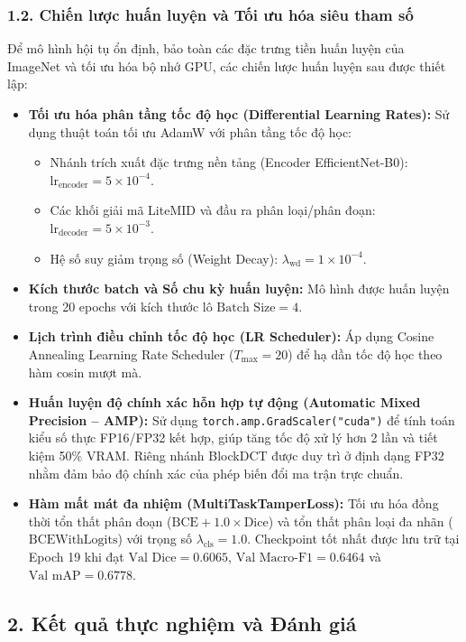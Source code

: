 \subsubsection{1.2. Chiến lược huấn luyện và Tối ưu hóa siêu tham số}
\indent\indent Để mô hình hội tụ ổn định, bảo toàn các đặc trưng tiền huấn luyện của ImageNet và tối ưu hóa bộ nhớ GPU, các chiến lược huấn luyện sau được thiết lập:
\begin{itemize}[label={--}, itemsep=2pt]
    \item \textbf{Tối ưu hóa phân tầng tốc độ học (Differential Learning Rates):} Sử dụng thuật toán tối ưu AdamW với phân tầng tốc độ học:
    \begin{itemize}[label={+}, itemsep=1pt]
        \item Nhánh trích xuất đặc trưng nền tảng (Encoder EfficientNet-B0): $\text{lr}_{\text{encoder}} = 5 \times 10^{-4}$.
        \item Các khối giải mã LiteMID và đầu ra phân loại/phân đoạn: $\text{lr}_{\text{decoder}} = 5 \times 10^{-3}$.
        \item Hệ số suy giảm trọng số (Weight Decay): $\lambda_{\text{wd}} = 1 \times 10^{-4}$.
    \end{itemize}
    \item \textbf{Kích thước batch và Số chu kỳ huấn luyện:} Mô hình được huấn luyện trong 20 epochs với kích thước lô $\text{Batch Size} = 4$.
    \item \textbf{Lịch trình điều chỉnh tốc độ học (LR Scheduler):} Áp dụng Cosine Annealing Learning Rate Scheduler ($T_{\max} = 20$) để hạ dần tốc độ học theo hàm cosin mượt mà.
    \item \textbf{Huấn luyện độ chính xác hỗn hợp tự động (Automatic Mixed Precision -- AMP):} Sử dụng \texttt{torch.amp.GradScaler("cuda")} để tính toán kiểu số thực FP16/FP32 kết hợp, giúp tăng tốc độ xử lý hơn 2 lần và tiết kiệm 50\% VRAM. Riêng nhánh BlockDCT được duy trì ở định dạng FP32 nhằm đảm bảo độ chính xác của phép biến đổi ma trận trực chuẩn.
    \item \textbf{Hàm mất mát đa nhiệm (MultiTaskTamperLoss):} Tối ưu hóa đồng thời tổn thất phân đoạn ($\text{BCE} + 1.0 \times \text{Dice}$) và tổn thất phân loại đa nhãn ($\text{BCEWithLogits}$) với trọng số $\lambda_{\text{cls}} = 1.0$. Checkpoint tốt nhất được lưu trữ tại Epoch 19 khi đạt $\text{Val Dice} = 0.6065$, $\text{Val Macro-F1} = 0.6464$ và $\text{Val mAP} = 0.6778$.
\end{itemize}

\subsection{2. Kết quả thực nghiệm và Đánh giá}

